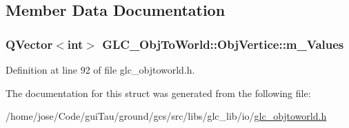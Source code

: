 \subsection{Member Data Documentation}
\hypertarget{struct_g_l_c___obj_to_world_1_1_obj_vertice_acb172a5bd9e66188b37b12ea38d5bf76}{
\subsubsection[{m\-\_\-\-Values}]{\setlength{\rightskip}{0pt plus 5cm}Q\-Vector$<${\bf int}$>$ G\-L\-C\-\_\-\-Obj\-To\-World\-::\-Obj\-Vertice\-::m\-\_\-\-Values}}\label{struct_g_l_c___obj_to_world_1_1_obj_vertice_acb172a5bd9e66188b37b12ea38d5bf76}


Definition at line 92 of file glc\-\_\-objtoworld.\-h.



The documentation for this struct was generated from the following file\-:\begin{DoxyCompactItemize}
\item 
/home/jose/\-Code/gui\-Tau/ground/gcs/src/libs/glc\-\_\-lib/io/\hyperlink{glc__objtoworld_8h}{glc\-\_\-objtoworld.\-h}\end{DoxyCompactItemize}
